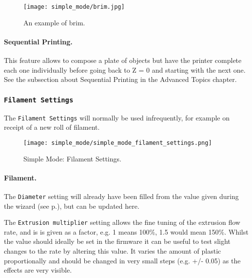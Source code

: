 \begin{figure}[H]
\centering
\texttt{[image: simple\_mode/brim.jpg]}
\caption{An example of brim.}
\label{fig:an_example_of_brim}
\end{figure}


\paragraph{Sequential Printing.} %
\label{par:sequential_printing}
This feature allows to compose a plate of objects but have the printer complete each one individually before going back to Z = 0 and starting with the next one. See the subsection about Sequential Printing in the Advanced Topics chapter.


\subsubsection{\texttt{Filament Settings}}

The \texttt{Filament Settings} will normally be used infrequently, for example on receipt of a new roll of filament.

\begin{figure}[H]
\centering
\texttt{[image: simple\_mode/simple\_mode\_filament\_settings.png]}
\caption{Simple Mode: Filament Settings.}
\label{fig:simple_mode_filament_settings}
\end{figure}

\paragraph{Filament.} %
\label{par:filament}
The \texttt{Diameter} setting will already have been filled from the value given during the wizard (see p.\pageref{sub:4_filament_diameter}), but can be updated here.

The \texttt{Extrusion multiplier} setting allows the fine tuning of the extrusion flow rate, and is is given as a factor, e.g. 1 means 100\%, 1.5 would mean 150\%.  Whilst the value should ideally be set in the firmware it can be useful to test slight changes to the rate by altering this value.  It varies the amount of plastic proportionally and should be changed in very small steps (e.g. +/- 0.05) as the effects are very visible.

